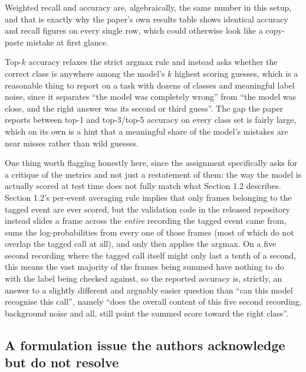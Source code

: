 \documentclass[11pt]{article}
\begin{document}
Weighted recall and accuracy are, algebraically, the same number in this setup, and that is exactly why the paper's own results table shows identical accuracy and recall figures on every single row, which could otherwise look like a copy-paste mistake at first glance.

Top-$k$ accuracy relaxes the strict argmax rule and instead asks whether the correct class is anywhere among the model's $k$ highest scoring guesses, which is a reasonable thing to report on a task with dozens of classes and meaningful label noise, since it separates ``the model was completely wrong'' from ``the model was close, and the right answer was its second or third guess''. The gap the paper reports between top-1 and top-3/top-5 accuracy on every class set is fairly large, which on its own is a hint that a meaningful share of the model's mistakes are near misses rather than wild guesses.

One thing worth flagging honestly here, since the assignment specifically asks for a critique of the metrics and not just a restatement of them: the way the model is actually scored at test time does not fully match what Section 1.2 describes. Section 1.2's per-event averaging rule implies that only frames belonging to the tagged event are ever scored, but the validation code in the released repository instead slides a frame across the \emph{entire} recording the tagged event came from, sums the log-probabilities from every one of those frames (most of which do not overlap the tagged call at all), and only then applies the argmax. On a five second recording where the tagged call itself might only last a tenth of a second, this means the vast majority of the frames being summed have nothing to do with the label being checked against, so the reported accuracy is, strictly, an answer to a slightly different and arguably easier question than ``can this model recognise this call'', namely ``does the overall content of this five second recording, background noise and all, still point the summed score toward the right class''.

\subsection{A formulation issue the authors acknowledge but do not resolve}
\end{document}
